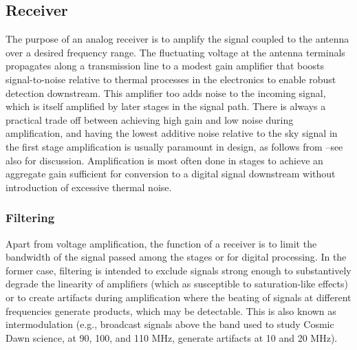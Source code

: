   
 
\subsection{Receiver}


The purpose of an analog receiver is to amplify the signal coupled to the antenna over a desired frequency range.  The fluctuating voltage at the antenna terminals propagates along a transmission line to a modest gain amplifier that boosts signal-to-noise relative to thermal processes in the electronics to enable robust detection downstream.  This amplifier too adds noise to the incoming signal, which is itself amplified by later stages in the signal path.    There is always a practical trade off between achieving high gain and low noise during amplification, and having the lowest additive noise relative to the sky signal in the first stage amplification is usually paramount in design, as follows from \cite{friis46}--see also \cite{pozar98} for discussion.  Amplification is most often done in stages to achieve an aggregate gain sufficient for conversion to a digital signal downstream without introduction of excessive thermal noise. 


\subsubsection{Filtering}

Apart from voltage amplification, the function of a receiver is to limit the bandwidth of the signal passed among the stages or for digital processing.  In the former case, filtering is  intended to exclude signals strong enough to substantively degrade the linearity of amplifiers (which as susceptible to saturation-like effects) or to create artifacts during amplification where the beating of signals at different frequencies generate products, which may be detectable. This is also known as intermodulation (e.g., broadcast signals above the band used to study Cosmic Dawn science,  at 90, 100, and 110 MHz, generate artifacts at 10 and 20 MHz).  

